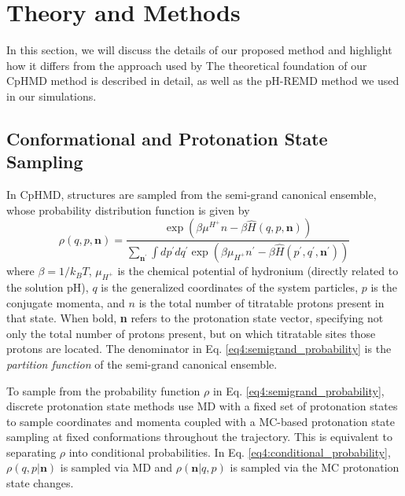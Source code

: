 \section{Theory and Methods}

In this section, we will discuss the details of our proposed method and
highlight how it differs from the approach used by
\citeauthor{Baptista_JChemPhys_2002_v117_p4184}
\cite{Baptista_JChemPhys_2002_v117_p4184} The theoretical foundation of
our CpHMD method is described in detail, as well as the pH-REMD method we used
in our simulations.

\subsection{Conformational and Protonation State Sampling}

In CpHMD, structures are sampled from the semi-grand canonical ensemble, whose
probability distribution function is given by
\begin{equation}
  \rho (q, p, \textbf{n}) =  \frac {\exp \left (\beta \mu ^ {H^+} n - \beta \hat
        H (q, p, \textbf{n}) \right )} {\sum_{\textbf{n$^\prime$}} \int
        dp^\prime dq^\prime \exp \left ( \beta \mu _ {H^+} n^\prime - \beta \hat
        H (p^\prime, q^\prime, \textbf{n$^\prime$}) \right )}
   \label{eq4:semigrand_probability}
\end{equation}
where $\beta = 1 / k_B T$, $\mu _ {H^+}$ is the chemical potential of hydronium
(directly related to the solution pH), $q$ is the generalized coordinates of the
system particles, $p$ is the conjugate momenta, and $n$ is the total number of
titratable protons present in that state. When bold, \textbf{n} refers to the
protonation state vector, specifying not only the total number of protons
present, but on which titratable sites those protons are located. The
denominator in Eq. \ref{eq4:semigrand_probability} is the \emph{partition
function} of the semi-grand canonical ensemble.

To sample from the probability function $\rho$ in Eq.
\ref{eq4:semigrand_probability}, discrete protonation state methods use MD with a
fixed set of protonation states to sample coordinates and momenta coupled with a
MC-based protonation state sampling at fixed conformations throughout the
trajectory. This is equivalent to separating $\rho$ into conditional
probabilities. In Eq. \ref{eq4:conditional_probability}, $\rho(q, p |
\textbf{n})$ is sampled via MD and $\rho(\textbf{n} | q, p)$ is sampled via the
MC protonation state changes.

